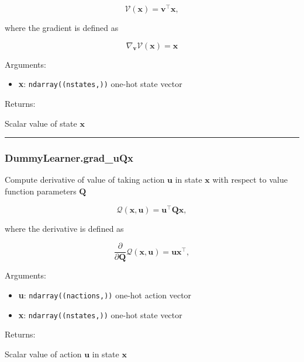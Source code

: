 \[
\mathcal V(\mathbf x) = \mathbf v^\top \mathbf x,
\]

where the gradient is defined as

\[
\nabla_{\mathbf v} \mathcal V(\mathbf x) = \mathbf x
\]

Arguments:

\begin{itemize}
\tightlist
\item
  \textbf{x}: \texttt{ndarray((nstates,))} one-hot state vector
\end{itemize}

Returns:

Scalar value of state \(\mathbf x\)

\begin{center}\rule{0.5\linewidth}{\linethickness}\end{center}

\subsubsection{DummyLearner.grad\_uQx}\label{dummylearner.grad_uqx}

\begin{Shaded}
\begin{Highlighting}[]
\end{Highlighting}
\end{Shaded}

Compute derivative of value of taking action \(\mathbf u\) in state
\(\mathbf x\) with respect to value function parameters \(\mathbf Q\)

\[
\mathcal Q(\mathbf x, \mathbf u) = \mathbf u^\top \mathbf Q \mathbf x,
\]

where the derivative is defined as

\[
\frac{\partial}{\partial \mathbf Q} \mathcal Q(\mathbf x, \mathbf u) = \mathbf u \mathbf x^\top,
\]

Arguments:

\begin{itemize}
\tightlist
\item
  \textbf{u}: \texttt{ndarray((nactions,))} one-hot action vector
\item
  \textbf{x}: \texttt{ndarray((nstates,))} one-hot state vector
\end{itemize}

Returns:

Scalar value of action \(\mathbf u\) in state \(\mathbf x\)

